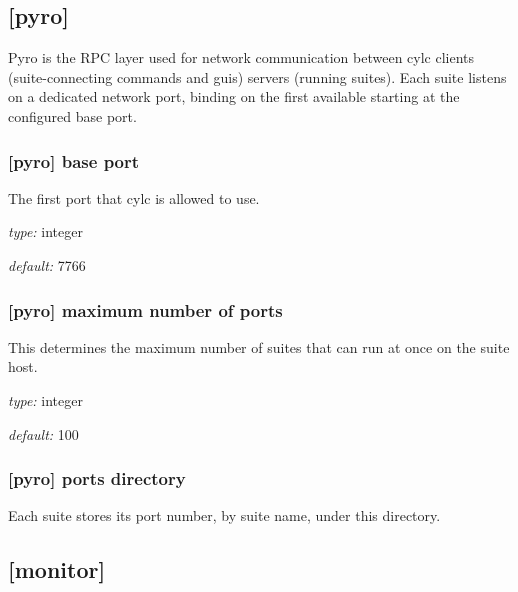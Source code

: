 \subsection{[pyro]}

Pyro is the RPC layer used for network communication between cylc
clients (suite-connecting commands and guis) servers (running suites).
Each suite listens on a dedicated network port, binding on the first
available starting at the configured base port.

\subsubsection[base port]{[pyro] \textrightarrow base port }

The first port that cylc is allowed to use.

\begin{myitemize}
\item {\em type:} integer
\item {\em default:} 7766
\end{myitemize}

\subsubsection[maximum number of ports]{[pyro] \textrightarrow maximum number of ports}

This determines the maximum number of suites that can run at once on the
suite host.

\begin{myitemize}
\item {\em type:} integer
\item {\em default:} 100
\end{myitemize}

\subsubsection[ports directory]{[pyro] \textrightarrow ports directory}

Each suite stores its port number, by suite name, under this directory.


\subsection{[monitor]}


